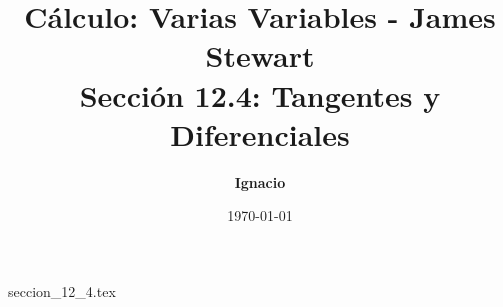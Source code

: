 \documentclass[11pt,spanish,oneside]{report}
\title{\textbf{Cálculo: Varias Variables - James Stewart} \\ \Large Sección 12.4: Tangentes y Diferenciales}
\author{\textbf{Ignacio}}
\date{\today}
\begin{document}
\maketitle

{seccion_12_4.tex}
\end{document}
